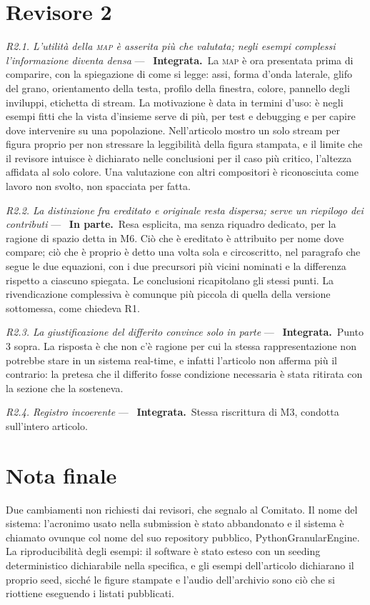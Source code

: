 \documentclass[11pt,a4paper]{article}
\newcommand{\integrata}{\textbf{Integrata.}}
\newcommand{\parziale}{\textbf{In parte.}}
\newenvironment{rilievi}
  {\begin{list}{}{%
    \setlength{\leftmargin}{1.6em}\setlength{\itemindent}{-1.6em}%
    \setlength{\itemsep}{4pt}\setlength{\parsep}{0pt}\setlength{\topsep}{4pt}}}
  {\end{list}}
\newcommand{\voce}[1]{\item \textit{#1} ---\ }
\begin{document}
\section*{Revisore 2}

\begin{rilievi}

\voce{R2.1. L'utilità della \textsc{map} è asserita più che valutata; negli
esempi complessi l'informazione diventa densa} \integrata\ La \textsc{map} è
ora presentata prima di comparire, con la spiegazione di come si legge: assi,
forma d'onda laterale, glifo del grano, orientamento della testa, profilo
della finestra, colore, pannello degli inviluppi, etichetta di stream. La
motivazione è data in termini d'uso: è negli esempi fitti che la vista
d'insieme serve di più, per test e debugging e per capire dove intervenire
su una popolazione. Nell'articolo mostro un solo stream per figura proprio
per non stressare la leggibilità della figura stampata, e il limite che il
revisore intuisce è dichiarato nelle conclusioni per il caso più critico,
l'altezza affidata al solo colore. Una valutazione con altri compositori è
riconosciuta come lavoro non svolto, non spacciata per fatta.

\voce{R2.2. La distinzione fra ereditato e originale resta dispersa; serve
un riepilogo dei contributi} \parziale\ Resa esplicita, ma senza riquadro
dedicato, per la ragione di spazio detta in M6. Ciò che è ereditato è
attribuito per nome dove compare; ciò che è proprio è detto una volta sola e
circoscritto, nel paragrafo che segue le due equazioni, con i due precursori
più vicini nominati e la differenza rispetto a ciascuno spiegata. Le
conclusioni ricapitolano gli stessi punti. La rivendicazione complessiva è
comunque più piccola di quella della versione sottomessa, come chiedeva R1.

\voce{R2.3. La giustificazione del differito convince solo in parte}
\integrata\ Punto 3 sopra. La risposta è che non c'è ragione per cui la
stessa rappresentazione non potrebbe stare in un sistema real-time, e
infatti l'articolo non afferma più il contrario: la pretesa che il differito
fosse condizione necessaria è stata ritirata con la sezione che la
sosteneva.

\voce{R2.4. Registro incoerente} \integrata\ Stessa riscrittura di M3,
condotta sull'intero articolo.

\end{rilievi}

\section*{Nota finale}

Due cambiamenti non richiesti dai revisori, che segnalo al Comitato. Il
nome del sistema: l'acronimo usato nella submission è stato abbandonato e il
sistema è chiamato ovunque col nome del suo repository pubblico,
PythonGranularEngine. La riproducibilità degli esempi: il software è stato
esteso con un seeding deterministico dichiarabile nella specifica, e gli
esempi dell'articolo dichiarano il proprio seed, sicché le figure stampate e
l'audio dell'archivio sono ciò che si riottiene eseguendo i listati
pubblicati.
\end{document}
